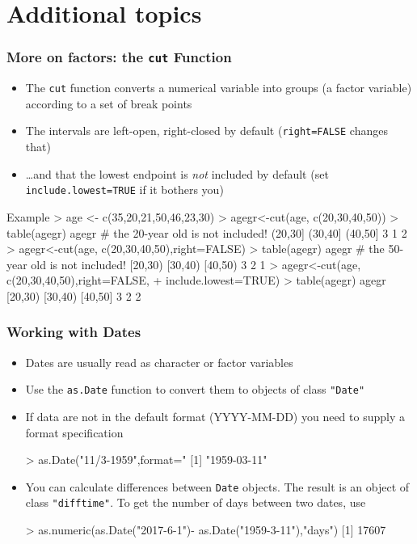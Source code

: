 \documentclass[xcolor=svgnames,handout]{beamer}
\newcommand{\code}[1]{\texttt{#1}}
\let\overbatim\verbatim
\let\endoverbatim\endverbatim
\newenvironment{vcode}%
{\bgroup\baselineskip=0.8\baselineskip\overbatim}%
{\endoverbatim\egroup}
\begin{document}
\section{Additional topics}
\begin{frame}
  \frametitle{More on factors: the \code{cut} Function}
  \begin{itemize}
  \item The \code{cut} function converts a numerical variable into groups
  (a factor variable)  according to a set of break points
  \item The intervals are left-open, right-closed by
    default (\code{right=FALSE} changes that)
  \item \dots and that the lowest endpoint is \emph{not} included by
    default (set \code{include.lowest=TRUE} if it bothers you)
  \end{itemize}
\end{frame}

\begin{frame}[fragile]
Example
\begin{vcode}
> age <- c(35,20,21,50,46,23,30)
> agegr<-cut(age, c(20,30,40,50))
> table(agegr)  
agegr      # the 20-year old is not included!
(20,30] (30,40] (40,50] 
      3       1       2 
> agegr<-cut(age, c(20,30,40,50),right=FALSE)
> table(agegr)
agegr    # the 50-year old is not included!
[20,30) [30,40) [40,50) 
      3       2       1 
> agegr<-cut(age, c(20,30,40,50),right=FALSE,
+                           include.lowest=TRUE)
> table(agegr)
agegr
[20,30) [30,40) [40,50] 
      3       2       2 
\end{vcode}
\end{frame}

\begin{frame}[fragile]
  \frametitle{Working with Dates}
  \begin{itemize}
  \item Dates are usually read as character or factor variables
    \pause
  \item Use the \code{as.Date} function to convert them to objects of
    class \code{"Date"}
    \pause
  \item If data are not in the default format (YYYY-MM-DD) you need to
    supply a format specification

    \begin{vcode}
> as.Date("11/3-1959",format="%
[1] "1959-03-11"
    \end{vcode}
    \pause
  \item You can calculate differences between \code{Date} objects. The
    result is an object of class  \code{"difftime"}. To get the number
    of days between two dates, use

    \begin{vcode}
> as.numeric(as.Date("2017-6-1")-
             as.Date("1959-3-11"),"days")
[1] 17607
    \end{vcode}
  \end{itemize}
\end{frame}
\end{document}
